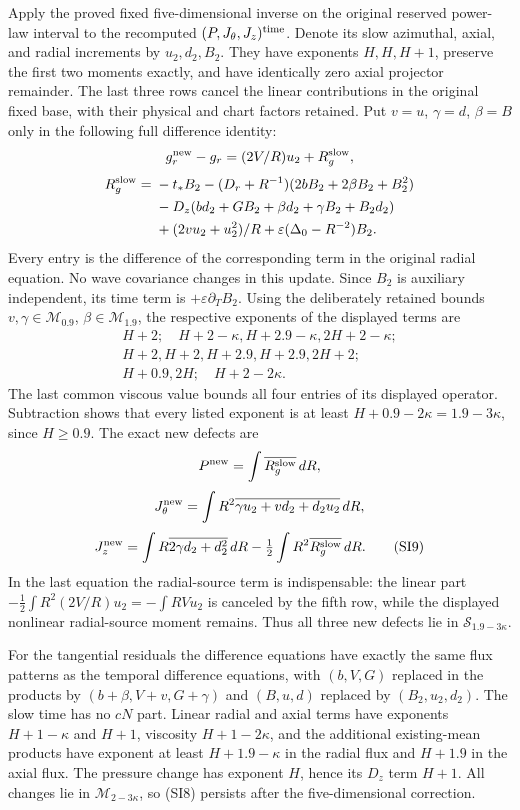 \documentclass[10pt,a4paper]{article}
\begin{document}
Apply the proved fixed five-dimensional inverse on the original reserved
power-law interval to the recomputed $(P,J_\theta,J_z)^{\rm time}$.
Denote its slow azimuthal, axial, and radial increments by $u_2,d_2,B_2$.
They have exponents $H,H,H+1$, preserve the first two moments exactly,
and have identically zero axial projector remainder.  The last three rows
cancel the linear contributions in the original fixed base, with their
physical and chart factors retained.  Put $v=u$, $\gamma=d$, $\beta=B$
only in the following full difference identity:
\[
g_r^{\rm new}-g_r=(2V/R)u_2+R_g^{\rm slow},
\]
\begin{align*}
R_g^{\rm slow}={}&-t_*B_2
 -(D_r+R^{-1})(2bB_2+2\beta B_2+B_2^2)\\
&-D_z(bd_2+GB_2+\beta d_2+\gamma B_2+B_2d_2)\\
&+(2vu_2+u_2^2)/R+\varepsilon(\Delta_0-R^{-2})B_2.
\end{align*}
Every entry is the difference of the corresponding term in the original
radial equation.  No wave covariance changes in this update.  Since $B_2$
is auxiliary independent, its time term is $+\varepsilon\partial_TB_2$.
Using the deliberately retained bounds
$v,\gamma\in\mathcal M_{0.9}$, $\beta\in\mathcal M_{1.9}$, the
respective exponents of the displayed terms are
\[
\begin{gathered}
H+2;\quad H+2-\kappa, H+2.9-\kappa, 2H+2-\kappa;\\
H+2, H+2, H+2.9, H+2.9, 2H+2;\\
H+0.9, 2H;\quad H+2-2\kappa.
\end{gathered}
\]
The last common viscous value bounds all four entries of its displayed
operator.  Subtraction shows that every listed exponent is at least
$H+0.9-2\kappa=1.9-3\kappa$, since $H\ge0.9$.
The exact new defects are
\[
P^{\rm new}=\int\overline{R_g^{\rm slow}}\,dR,
\]
\[
J_\theta^{\rm new}=\int R^2\overline{\gamma u_2+vd_2+d_2u_2}\,dR,
\]
\[
J_z^{\rm new}=\int R\overline{2\gamma d_2+d_2^2}\,dR
-\tfrac12\int R^2\overline{R_g^{\rm slow}}\,dR.
\tag{SI9}
\]
In the last equation the radial-source term is indispensable: the linear
part $-\tfrac12\int R^2(2V/R)u_2=-\int RVu_2$ is canceled by the
fifth row, while the displayed nonlinear radial-source moment remains.
Thus all three new defects lie in $\mathcal S_{1.9-3\kappa}$.

For the tangential residuals the difference equations have exactly the same
flux patterns as the temporal difference equations, with $(b,V,G)$ replaced
in the products by $(b+\beta,V+v,G+\gamma)$ and $(B,u,d)$ replaced by
$(B_2,u_2,d_2)$.  The slow time has no $cN$ part.  Linear radial and
axial terms have exponents $H+1-\kappa$ and $H+1$, viscosity
$H+1-2\kappa$, and the additional existing-mean products have exponent
at least $H+1.9-\kappa$ in the radial flux and $H+1.9$ in the axial
flux.  The pressure change has exponent $H$, hence its $D_z$ term
$H+1$.  All changes lie in $\mathcal M_{2-3\kappa}$, so (SI8)
persists after the five-dimensional correction.
\end{document}
